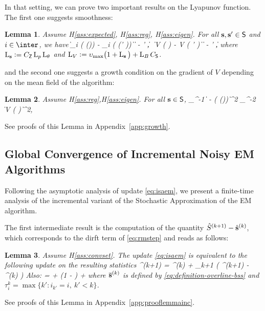\documentclass[11pt]{article}
\newtheorem{Lemma}{Lemma}
\theoremstyle{t}
\begin{document}
In that setting, we can prove two important results on the Lyapunov function. The first one suggests smoothness:
\begin{Lemma} \label{lem:smooth}
\citep{karimi2019global} Assume H\ref{ass:expected}, H\ref{ass:reg}, H\ref{ass:eigen}.  
For all $\bss,\bss' \in \Sset$ and $i \in \inter$, we have
\beq \label{eq:smooth}
\| \overline{\bss}_i ( \overline{\param} ({\bss})) - \overline{\bss}_i ( \overline{\param} ({\bss}' )) \| \leq \Lip{{\bss}} \| {\bss} - {\bss}' \|,~~\| \grd  V ( {\bss} ) - \grd  V ( {\bss}' ) \| \leq {} \| {\bss} - {\bss}' \|,
\eeq
where $\Lip{\bss} \eqdef C_{\Zset} \Lip{p} \Lip{\theta}$ and $\Lip{V}  \eqdef \upsilon_{\max} \big( 1 + \Lip{{\bss}} \big) + \Lip{B} C_{\Sset}$.
\end{Lemma}
and the second one suggests a growth condition on the gradient of $V$ depending on the mean field of the algorithm:
\begin{Lemma}\label{lem:growth}
Assume H\ref{ass:reg},H\ref{ass:eigen}. For all $\bss \in \Sset$,
\beq \label{eq:semigrad}
\upsilon_{\min}^{-1} 
\geq \big\| {\bss} - \os( \op ({\bss})) \big\|^2 \geq \upsilon_{\max}^{-2} \| \grd V ( {\bss} ) \|^2,
\eeq
\end{Lemma}
See proofs of this Lemma in Appendix~\ref{app:growth}.

\subsection{Global Convergence of Incremental Noisy EM Algorithms}
Following the asymptotic analysis of update \eqref{eq:isaem}, we present a finite-time analysis of the incremental variant of the Stochastic Approximation of the EM algorithm.

The first intermediate result is the computation of the quantity $\hat{S}^{(k+1)} - \hat{\bss}^{(k)}$, which corresponds to the dirft term of \eqref{eq:rmstep} and reads as follows:
\begin{Lemma} \label{lem:meanfield_isaem}
 Assume H\ref{ass:convset}. The update \eqref{eq:isaem} is equivalent to the following update on the resulting statistics 
\beq
\hat{\bss}^{(k+1)} =  \hat{\bss}^{(k)}  + \gamma_{k+1} \big( ^{(k+1)} - \hat{\bss}^{(k)} \big)
\eeq 
Also:
\beq
\EE{} = \EE{} + \left(1 -  \right) \EE\left[\frac{1}{n} \sum_{i=1}^n \tilde{S}_i^{(\tau_i^k)}- \overline{\bss}^{(k)}\right]  +\EE{}
\eeq
where $\overline{\bss}^{(k)}$ is defined by \eqref{eq:definition-overline-bss} and $\tau_i^k = \max \{ k' : i_{k'} = i,~k' < k \}$.
\end{Lemma}
See proofs of this Lemma in Appendix~\ref{app:prooflemmainc}.
\end{document}
